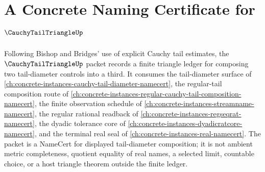 \chapter{A Concrete Naming Certificate for $\CauchyTailTriangleUp$}
\label{ch:concrete-instances-cauchy-tail-triangle-namecert}

Following Bishop and Bridges' use of explicit Cauchy tail estimates, the $\CauchyTailTriangleUp$ packet records a finite triangle ledger for composing two tail-diameter controls into a third. It consumes the tail-diameter surface of \autoref{ch:concrete-instances-cauchy-tail-diameter-namecert}, the regular-tail composition route of \autoref{ch:concrete-instances-regular-cauchy-tail-composition-namecert}, the finite observation schedule of \autoref{ch:concrete-instances-streamname-namecert}, the regular rational readback of \autoref{ch:concrete-instances-regseqrat-namecert}, the dyadic tolerance core of \autoref{ch:concrete-instances-dyadicratcore-namecert}, and the terminal real seal of \autoref{ch:concrete-instances-real-namecert}. The packet is a NameCert for displayed tail-diameter composition; it is not ambient metric completeness, quotient equality of real names, a selected limit, countable choice, or a host triangle theorem outside the finite ledger.

